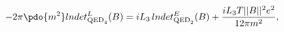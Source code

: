 \begin{equation}
\label{Eq_0602}
-2 \pi \pdo{m^2} lndet^L_{\text{QED}_4}(B)
  = i L_3 \, lndet^E_{\text{QED}_2}(B)
    + \frac{i L_3 T ||B||^2 e^2}{12 \pi m^2},
\end{equation}

